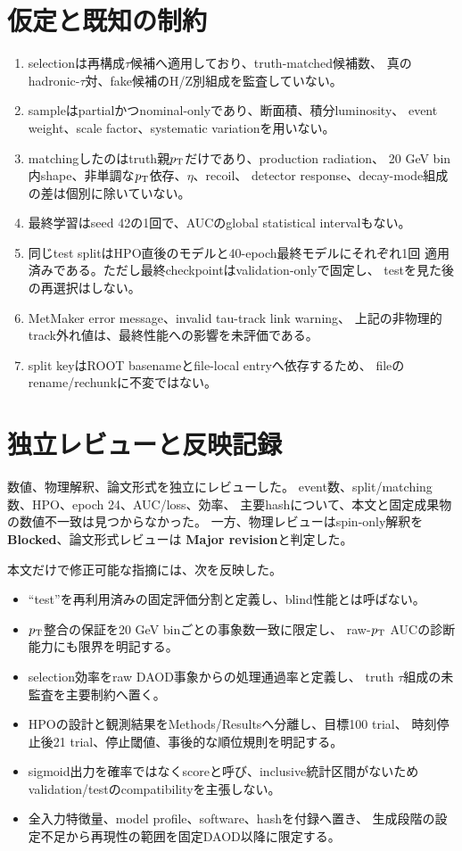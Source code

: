 \documentclass[xelatex,ja=standard,a4paper,10pt]{bxjsarticle}
\begin{document}
\section{仮定と既知の制約}

\begin{enumerate}
  \item selectionは再構成\(\tau\)候補へ適用しており、truth-matched候補数、
    真のhadronic-\(\tau\)対、fake候補のH/Z別組成を監査していない。
  \item sampleはpartialかつnominal-onlyであり、断面積、積分luminosity、
    event weight、scale factor、systematic variationを用いない。
  \item matchingしたのはtruth親\(p_{\mathrm{T}}\)だけであり、production radiation、
    20 GeV bin内shape、非単調な\(p_{\mathrm{T}}\)依存、\(\eta\)、recoil、
    detector response、decay-mode組成の差は個別に除いていない。
  \item 最終学習はseed 42の1回で、AUCのglobal statistical intervalもない。
  \item 同じtest splitはHPO直後のモデルと40-epoch最終モデルにそれぞれ1回
    適用済みである。ただし最終checkpointはvalidation-onlyで固定し、
    testを見た後の再選択はしない。
  \item MetMaker error message、invalid tau-track link warning、
    上記の非物理的track外れ値は、最終性能への影響を未評価である。
  \item split keyはROOT basenameとfile-local entryへ依存するため、
    fileのrename/rechunkに不変ではない。
\end{enumerate}

\section{独立レビューと反映記録}

数値、物理解釈、論文形式を独立にレビューした。
event数、split/matching数、HPO、epoch 24、AUC/loss、効率、
主要hashについて、本文と固定成果物の数値不一致は見つからなかった。
一方、物理レビューはspin-only解釈を\textbf{Blocked}、論文形式レビューは
\textbf{Major revision}と判定した。

本文だけで修正可能な指摘には、次を反映した。
\begin{itemize}
  \item ``test''を再利用済みの固定評価分割と定義し、blind性能とは呼ばない。
  \item \(p_{\mathrm{T}}\)整合の保証を20 GeV binごとの事象数一致に限定し、
    raw-\(p_{\mathrm{T}}\) AUCの診断能力にも限界を明記する。
  \item selection効率をraw DAOD事象からの処理通過率と定義し、
    truth \(\tau\)組成の未監査を主要制約へ置く。
  \item HPOの設計と観測結果をMethods/Resultsへ分離し、目標100 trial、
    時刻停止後21 trial、停止閾値、事後的な順位規則を明記する。
  \item sigmoid出力を確率ではなくscoreと呼び、inclusive統計区間がないため
    validation/testのcompatibilityを主張しない。
  \item 全入力特徴量、model profile、software、hashを付録へ置き、
    生成段階の設定不足から再現性の範囲を固定DAOD以降に限定する。
\end{itemize}
\end{document}
